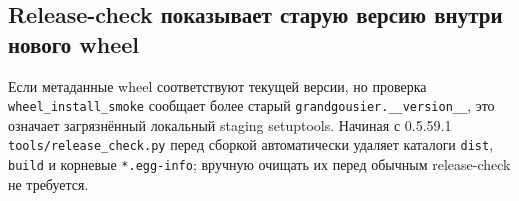 \subsection{Release-check показывает старую версию внутри нового wheel}

Если метаданные wheel соответствуют текущей версии, но проверка \texttt{wheel\_install\_smoke} сообщает более старый \texttt{grandgousier.\_\_version\_\_}, это означает загрязнённый локальный staging setuptools. Начиная с 0.5.59.1 \texttt{tools/release\_check.py} перед сборкой автоматически удаляет каталоги \texttt{dist}, \texttt{build} и корневые \texttt{*.egg-info}; вручную очищать их перед обычным release-check не требуется.
